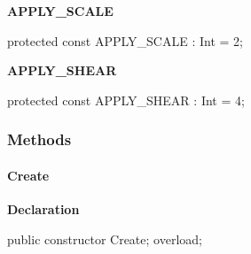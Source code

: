 \documentclass{report}
\newif\ifpdf
\begin{document}
\begin{list}{}
\begin{flushleft}
\ifpdf
\end{flushleft}
\fi


\par  \label{NewPascal.GUI.Geom.AffineTransform-APPLY_SCALE}
\item[\textbf{APPLY{\_}SCALE}\hfill]
\ifpdf
\begin{flushleft}
\fi
\begin{ttfamily}
protected const APPLY{\_}SCALE              : Int = 2;\end{ttfamily}

\ifpdf
\end{flushleft}
\fi


\par  \label{NewPascal.GUI.Geom.AffineTransform-APPLY_SHEAR}
\item[\textbf{APPLY{\_}SHEAR}\hfill]
\ifpdf
\begin{flushleft}
\fi
\begin{ttfamily}
protected const APPLY{\_}SHEAR              : Int = 4;\end{ttfamily}

\ifpdf
\end{flushleft}
\fi


\par  \end{list}
\subsubsection*{\large{\textbf{Methods}}\normalsize\hspace{1ex}\hfill}
\paragraph*{Create}\hspace*{\fill}

\label{NewPascal.GUI.Geom.AffineTransform-Create}
\begin{list}{}{
\setlength{\itemindent}{0cm}
\setlength{\listparindent}{0cm}
\setlength{\leftmargin}{\evensidemargin}
\addtolength{\leftmargin}{\tmplength}
\settowidth{\labelsep}{X}
\addtolength{\leftmargin}{\labelsep}
\setlength{\labelwidth}{\tmplength}
}
\item[\textbf{Declaration}\hfill]
\ifpdf
\begin{flushleft}
\fi
\begin{ttfamily}
public constructor Create; overload;\end{ttfamily}

\ifpdf
\end{flushleft}
\fi

\end{list}
\end{document}

